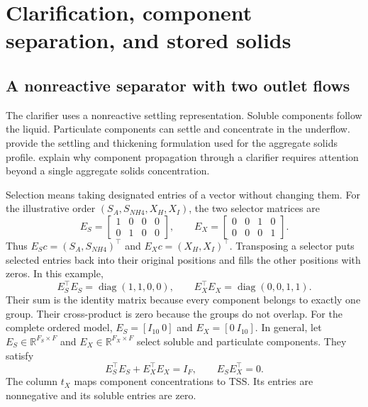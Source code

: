 \section{Clarification, component separation, and stored solids}

\subsection{A nonreactive separator with two outlet flows}

The clarifier uses a nonreactive settling representation. Soluble components follow the liquid. Particulate components can settle and concentrate in the underflow. \citet{Takacs1991} provide the settling and thickening formulation used for the aggregate solids profile. \citet{JeppssonDiehl1996} explain why component propagation through a clarifier requires attention beyond a single aggregate solids concentration.

Selection means taking designated entries of a vector without changing them. For the illustrative order $(S_A,S_{NH4},X_H,X_I)$, the two selector matrices are
\begin{equation}
E_S=\begin{bmatrix}1&0&0&0\\0&1&0&0\end{bmatrix},\qquad
E_X=\begin{bmatrix}0&0&1&0\\0&0&0&1\end{bmatrix}.
\end{equation}
Thus $E_Sc=(S_A,S_{NH4})^\top$ and $E_Xc=(X_H,X_I)^\top$. Transposing a selector puts selected entries back into their original positions and fills the other positions with zeros. In this example,
\begin{equation}
E_S^\top E_S=\operatorname{diag}(1,1,0,0),\qquad
E_X^\top E_X=\operatorname{diag}(0,0,1,1).
\end{equation}
Their sum is the identity matrix because every component belongs to exactly one group. Their cross-product is zero because the groups do not overlap. For the complete ordered model, $E_S=[I_{10}\ 0]$ and $E_X=[0\ I_{10}]$. In general, let $E_S\in\mathbb R^{F_S\times F}$ and $E_X\in\mathbb R^{F_X\times F}$ select soluble and particulate components. They satisfy
\begin{equation}
E_S^\top E_S+E_X^\top E_X=I_F,\qquad E_SE_X^\top=0.
\end{equation}
The column $t_X$ maps component concentrations to TSS. Its entries are nonnegative and its soluble entries are zero.


